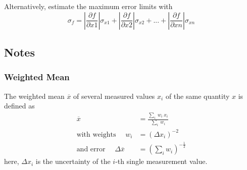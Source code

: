 Alternatively, estimate the maximum error limits with
\begin{equation}\label{eq:abs}
		\sigma_{f} = \left| \frac{\partial f}{\partial x1}\right| \sigma_{x1} + \left| \frac{\partial f}{\partial x2}\right| \sigma_{x2} + ... + \left| \frac{\partial f}{\partial xn}\right| \sigma_{xn}
\end{equation}
%
\subsection{Notes}
%
\subsubsection*{Weighted Mean}
The weighted mean $\overline{x}$ of several measured values $x_i$ of the same quantity $x$ is defined as
\begin{subequations}\label{eq:weighted_mean}
    \begin{align}
    \overline{x} & = \frac{\sum\limits_{i}\ w_i \ x_{i}}{\sum\limits_{i} \ w_i }  \label{eq:wmean}\\
    \text{with weights } \quad w_i & = (\Delta x_{i})^{-2} \\
    \text{and error } \quad \Delta \overline{x} & = \left(  \sum\limits_{i} w_i  \right)^{-\frac{1}{2}} \label{eq:wmeanerr}
    \end{align}
\end{subequations}
here, $\Delta x_i$ is the uncertainty of the $i$-th single measurement value.
